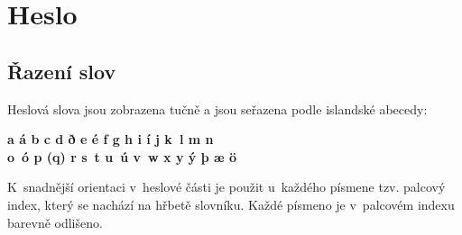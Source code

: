 \def\tableD{\noindent\begin{tabularx}{\columnwidth}{>{\bfseries}lllll}
  \toprule
  \textit{zkratka} & \textit{slovo} & \textit{pád} & \textit{číslo}
    & \specialcell{\textit{předmět}\\\textit{podmět}} \\
  \midrule
  e-að  & eitthvað   & 1. & sg & neživotný \\
  e-ð   & eitthvað   & 4. & sg & neživotný \\
  e-ir  & einhverjir & 1. & pl & životný \\
  e-ja  & einhverja  & 4. & pl & životný \\
  e-jum & einhverjum & 3. & pl & životný \\
  e-m   & einhverjum & 3. & sg & životný \\
  e-n   & einhvern   & 4. & sg & životný \\
  e-r   & einhver    & 1. & sg & životný \\
  e-rra & einhverra  & 2. & pl & životný \\
  e-rs  & einhvers   & 2. & sg & životný \\
  e-s   & einhverns  & 2. & sg & neživotný \\
  e-u   & einhverju  & 3. & sg & neživotný \\
  \bottomrule
  \end{tabularx}
  \captionof{table}{Seznam použitých zkratek neurčitých zájmen}
  \label{table4}}


\section{Heslo}

\subsection*{Řazení slov}

Heslová slova jsou zobrazena tučně a jsou seřazena podle islandské abecedy:

\blspace
{\bfseries\centering
  a á b c d ð e é f g h i í j k~l m n\\
  o~ó p (q) r s~t u~ú v~w x y ý þ æ ö\par}
\blspace

K~snadnější orientaci v~heslové části je použit u~každého písmene tzv. palcový index, který se nachází na hřbetě slovníku. Každé písmeno je v~palcovém indexu barevně odlišeno.

